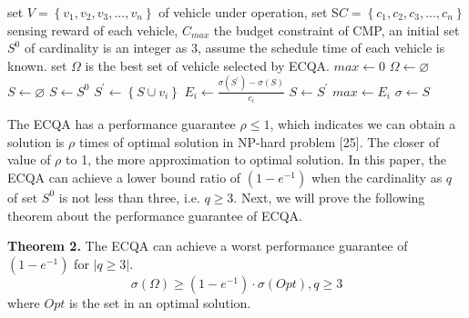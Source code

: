 \documentclass[journal]{IEEEtran}
\begin{document}
\renewcommand{\algorithmicrequire}{\textbf{Input:}}
\renewcommand{\algorithmicensure}{\textbf{Output:}}
\begin{algorithm}
	\caption{}	
	\begin{algorithmic}
		\Require set $V=\left \{  v_{1},v_{2},v_{3},...,v_{n}\right \}$ of vehicle under operation, set S$C=\left \{  c_{1},c_{2},c_{3},...,c_{n}\right \}$ sensing reward of each vehicle, $C_{max}$ the budget constraint of CMP, an initial set $S^{0}$ of cardinality is an integer as 3, assume the schedule time of each vehicle is known.
		\Ensure set $\Omega $ is the best set of vehicle selected by ECQA. 
		\State $max \gets 0$
		\State $\Omega \gets \varnothing$
		\State $S \gets \varnothing$
			\State $S \gets S^{0}$
				\State $S^{'} \gets \left \{ S\cup v_{i} \right \}$
				\State $E_{i} \gets \frac{\sigma(S^{'})-\sigma (S)}{c_{i}}$
					\State $S \gets S^{'}$
					\State $max \gets E_{i}$
				\EndIf
					\State $ \sigma \gets S$
				\EndIf
			\EndFor		
		\EndFor				
	\end{algorithmic}
\end{algorithm}


The ECQA has a performance guarantee $ \rho \leqslant 1$, which indicates we can obtain a solution is $\rho$ times of optimal solution in NP-hard problem [25]. The closer of value of $\rho$ to 1, the more approximation to optimal solution. In this paper, the ECQA can achieve a lower bound ratio of  $\left (1-e^{-1}  \right )$ when the cardinality as $q$ of set $S^{0}$ is not less than three, i.e. $q\geqslant 3$. Next, we will prove the following theorem about the performance guarantee of ECQA.

\noindent
\textbf{Theorem 2.} The ECQA can achieve a worst performance guarantee of  $\left (1-e^{-1}  \right )$ for $\left |q\geqslant 3 \right|$. 
\begin{equation}
\sigma (\Omega )\geqslant \left (1-e^{-1}  \right )\cdot \sigma (Opt), q\geqslant 3
\end{equation}
where $Opt$ is the set in an optimal solution.
\end{document}
